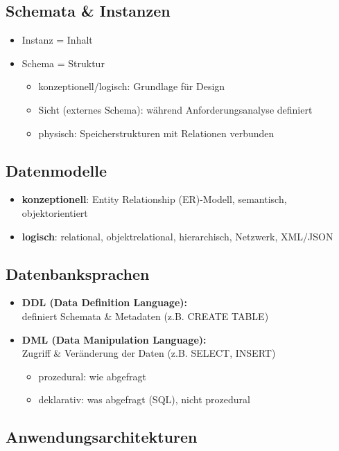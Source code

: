 \documentclass[12pt,a4paper]{article}
\begin{document}
\subsection{Schemata \& Instanzen}

\begin{itemize}
\item Instanz = Inhalt
\item Schema = Struktur
\begin{itemize}
\item konzeptionell/logisch: Grundlage für Design
\item Sicht (externes Schema): während Anforderungsanalyse definiert
\item physisch: Speicherstrukturen mit Relationen verbunden
\end{itemize}
\end{itemize}

\subsection{Datenmodelle}

\begin{itemize}
\item \textbf{konzeptionell}: Entity Relationship (ER)-Modell, semantisch, objektorientiert
\item \textbf{logisch}: relational, objektrelational, hierarchisch, Netzwerk, XML/JSON
\end{itemize}

\subsection{Datenbanksprachen}

\begin{itemize}
\item \textbf{DDL (Data Definition Language):} \\
definiert Schemata \& Metadaten (z.B. CREATE TABLE)
\item \textbf{DML (Data Manipulation Language):} \\
Zugriff \& Veränderung der Daten (z.B. SELECT, INSERT)
\begin{itemize}
\item prozedural: wie abgefragt
\item deklarativ: was abgefragt (SQL), nicht prozedural
\end{itemize}
\end{itemize}

\subsection{Anwendungsarchitekturen}
\end{document}
